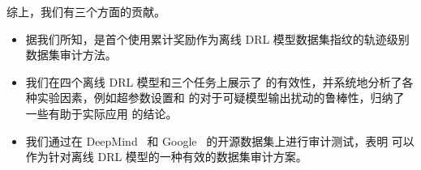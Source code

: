 综上，我们有三个方面的贡献。
\begin{itemize}
    \item 据我们所知，\sysnameo 是首个使用累计奖励作为离线 DRL 模型数据集指纹的轨迹级别数据集审计方法。
    \item 我们在四个离线 DRL 模型和三个任务上展示了 \sysnameo 的有效性，并系统地分析了各种实验因素，例如超参数设置和 \sysnameo 的对于可疑模型输出扰动的鲁棒性，归纳了一些有助于实际应用 \sysnameo 的结论。
    \item 我们通过在 DeepMind~\cite{DBLP:conf/nips/Gulcehre0NPCZAM20} 和 Google~\cite{DBLP:conf/nips/Pomerleau88} 的开源数据集上进行审计测试，表明 \sysnameo 可以作为针对离线 DRL 模型的一种有效的数据集审计方案。
\end{itemize}



